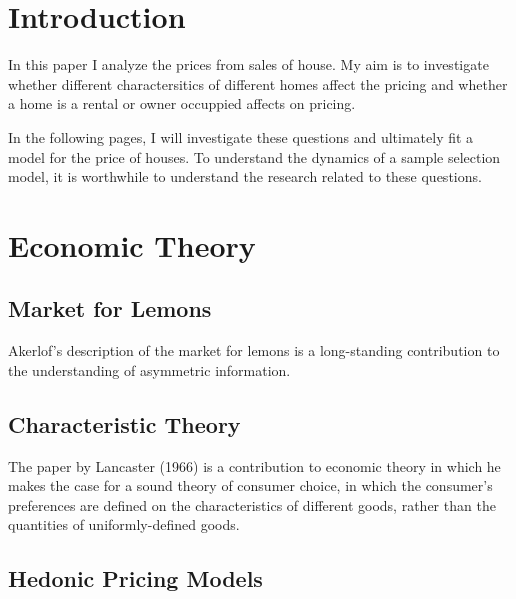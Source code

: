%
%
%

\section{Introduction}

In this paper I analyze the prices from sales of house. 
My aim is to investigate whether different charactersitics of different homes affect the pricing and whether a home is a rental or owner occuppied affects on pricing.

In the following pages, I will investigate these questions and
ultimately fit a model for the price of houses. 
To understand the dynamics of a sample selection model, 
it is worthwhile to understand the research related to these questions. 



\section{Economic Theory}

\subsection{Market for Lemons}

Akerlof's description of the market for lemons is a long-standing contribution to the understanding of asymmetric information. 


\subsection{Characteristic Theory}

The paper by Lancaster (1966) is a contribution to economic theory in which he makes the case for a sound theory of consumer choice, 
in which the consumer's preferences are defined on the characteristics of different goods, 
rather than the quantities of uniformly-defined goods.


\subsection{Hedonic Pricing Models}

